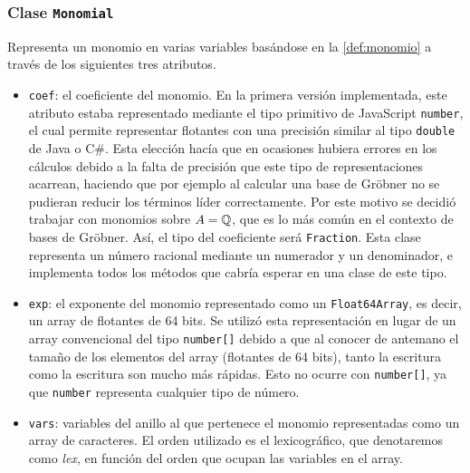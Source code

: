 \subsubsection{Clase \texttt{Monomial}}\label{sec:monomial}
Representa un monomio en varias variables basándose en la \autoref{def:monomio} a través de los siguientes tres atributos.
\begin{itemize}
    \item \texttt{coef}: el coeficiente del monomio. En la primera versión implementada, este atributo estaba representado mediante el tipo primitivo de JavaScript \texttt{number}, el cual permite representar flotantes con una precisión similar al tipo \texttt{double} de Java o C\#. Esta elección hacía que en ocasiones hubiera errores en los cálculos debido a la falta de precisión que este tipo de representaciones acarrean, haciendo que por ejemplo al calcular una base de Gröbner no se pudieran reducir los términos líder correctamente. Por este motivo se decidió trabajar con monomios sobre $A=\mathbb{Q}$, que es lo más común en el contexto de bases de Gröbner. Así, el tipo del coeficiente será \texttt{Fraction}. Esta clase representa un número racional mediante un numerador y un denominador, e implementa todos los métodos que cabría esperar en una clase de este tipo.
    \item \texttt{exp}: el exponente del monomio representado como un \texttt{Float64Array}, es decir, un array de flotantes de 64 bits. Se utilizó esta representación en lugar de un array convencional del tipo \texttt{number[]} debido a que al conocer de antemano el tamaño de los elementos del array (flotantes de 64 bits), tanto la escritura como la escritura son mucho más rápidas. Esto no ocurre con \texttt{number[]}, ya que \texttt{number} representa cualquier tipo de número.
    \item \texttt{vars}: variables del anillo al que pertenece el monomio representadas como un array de caracteres. El orden utilizado es el lexicográfico, que denotaremos como \textit{lex}, en función del orden que  ocupan las variables en el array.
\end{itemize}

